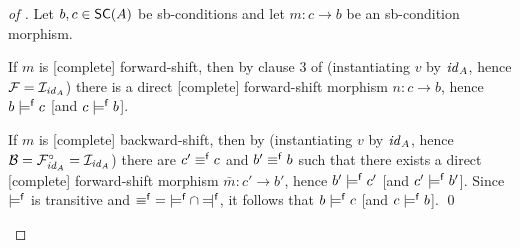 \begin{proof}[of ]
Let $b,c\in \SC A$ be sb-conditions and let $m:c\to b$ be an sb-condition morphism.
\begin{itemizeS}
\item If $m$ is [complete] forward-shift, then by clause 3 of  (instantiating $v$ by $\mathit{id}_A$, hence $\mathcal{F}=\mathcal{I}_{\mathit{id}_A}$) there is a direct [complete] forward-shift morphism $n:c\to b$, hence $b\models^{\mathsf f} c$ [and $c\models^{\mathsf f} b$].
\item If $m$ is [complete] backward-shift, then by  (instantiating $v$ by $\mathit{id}_A$, hence $\mathcal{B}=\mathcal{F}^\circ_{\mathit{id}_A}=\mathcal{I}_{\mathit{id}_A}$) there are $c'\equiv^{\mathsf f} c$ and $b'\equiv^{\mathsf f} b$ such that there exists a direct [complete] forward-shift morphism $\bar m:c'\to b'$, hence $b'\models^{\mathsf f} c'$ [and $c'\models^{\mathsf f} b'$]. Since $\models^{\mathsf f}$ is transitive and ${\pequiv}={\pentails}\cap{\pentailedby}$, it follows that $b\models^{\mathsf f} c$ [and $c\models^{\mathsf f} b$].
\qed
\end{itemizeS}
\end{proof}
